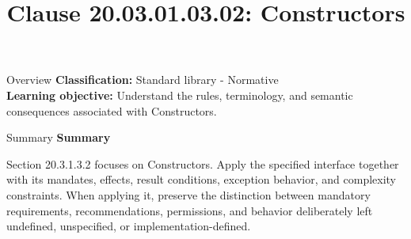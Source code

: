 \documentclass[10pt,letterpaper]{article}
\title{Clause 20.03.01.03.02: Constructors}
\author{}
\date{}
\begin{document}
\maketitle
\begin{CornellOverviewBox}{Overview}
\textbf{Classification:} Standard library - Normative\\[2pt]
\textbf{Learning objective:} Understand the rules, terminology, and semantic consequences associated with Constructors.
\end{CornellOverviewBox}\begin{CornellSummaryBox}{Summary}
{\sffamily\bfseries\color{Accent} Summary}\par\vspace{3pt}Section 20.3.1.3.2 focuses on Constructors. Apply the specified interface together with its mandates, effects, result conditions, exception behavior, and complexity constraints. When applying it, preserve the distinction between mandatory requirements, recommendations, permissions, and behavior deliberately left undefined, unspecified, or implementation-defined.
\end{CornellSummaryBox}
\end{document}
